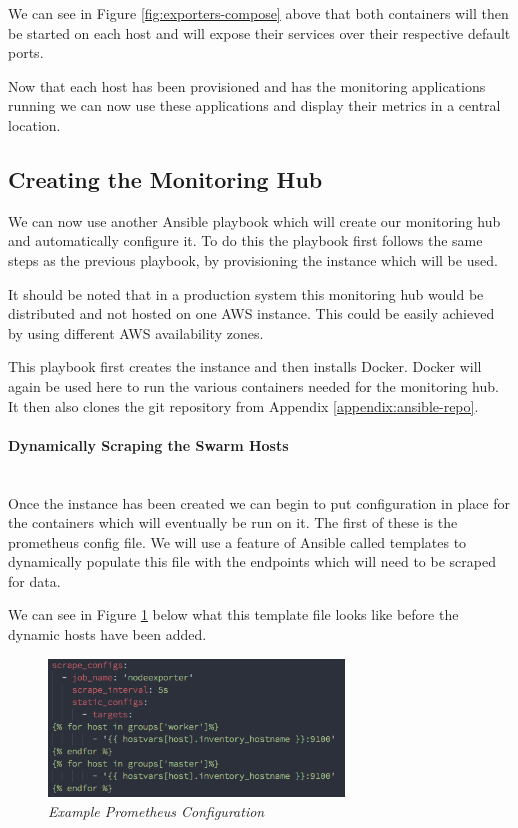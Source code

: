 We can see in Figure \ref{fig:exporters-compose} above that both containers will then be started on each host and will expose their services over their respective default ports.

Now that each host has been provisioned and has the monitoring applications running we can now use these applications and display their metrics in a central location.

\subsection{Creating the Monitoring Hub}
\label{sub:hub}
We can now use another Ansible playbook which will create our monitoring hub and automatically configure it. To do this the playbook first follows the same steps as the previous playbook, by provisioning the instance which will be used. 

It should be noted that in a production system this monitoring hub would be distributed and not hosted on one AWS instance. This could be easily achieved by using different AWS availability zones.

This playbook first creates the instance and then installs Docker. Docker will again be used here to run the various containers needed for the monitoring hub. It then also clones the git repository from Appendix \ref{appendix:ansible-repo}.

\paragraph{Dynamically Scraping the Swarm Hosts}\mbox{}\\
Once the instance has been created we can begin to put configuration in place for the containers which will eventually be run on it. The first of these is the prometheus config file. We will use a feature of Ansible called templates to dynamically populate this file with the endpoints which will need to be scraped for data.

We can see in Figure \ref{fig:prometheus-config} below what this template file looks like before the dynamic hosts have been added.

\begin{figure}[!h]
\centering
\includegraphics*[width=0.7\textwidth]{components/images/prometheus-config}
\caption{\em Example Prometheus Configuration}
\label{fig:prometheus-config}
\end{figure}

